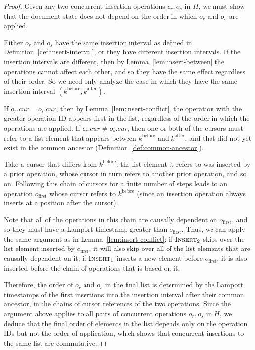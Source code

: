 \documentclass[10pt,journal,compsoc]{IEEEtran}
\begin{document}
\begin{proof}
Given any two concurrent insertion operations $o_r, o_s$ in $H$, we must show that the document state does not depend on the order in which $o_r$ and $o_s$ are applied.

Either $o_r$ and $o_s$ have the same insertion interval as defined in Definition~\ref{def:insert-interval}, or they have different insertion intervals. If the insertion intervals are different, then by Lemma~\ref{lem:insert-between} the operations cannot affect each other, and so they have the same effect regardless of their order. So we need only analyze the case in which they have the same insertion interval $(k^\mathrm{before}, k^\mathrm{after})$.

If $o_r.\mathit{cur} = o_s.\mathit{cur}$, then by Lemma~\ref{lem:insert-conflict}, the operation with the greater operation ID appears first in the list, regardless of the order in which the operations are applied. If $o_r.\mathit{cur} \not= o_s.\mathit{cur}$, then one or both of the cursors must refer to a list element that appears between $k^\mathrm{before}$ and $k^\mathrm{after}$, and that did not yet exist in the common ancestor (Definition~\ref{def:common-ancestor}).

Take a cursor that differs from $k^\mathrm{before}$: the list element it refers to was inserted by a prior operation, whose cursor in turn refers to another prior operation, and so on. Following this chain of cursors for a finite number of steps leads to an operation $o_\mathrm{first}$ whose cursor refers to $k^\mathrm{before}$ (since an insertion operation always inserts at a position after the cursor).

Note that all of the operations in this chain are causally dependent on $o_\mathrm{first}$, and so they must have a Lamport timestamp greater than $o_\mathrm{first}$. Thus, we can apply the same argument as in Lemma~\ref{lem:insert-conflict}: if $\textsc{Insert}_2$ skips over the list element inserted by $o_\mathrm{first}$, it will also skip over all of the list elements that are causally dependent on it; if $\textsc{Insert}_1$ inserts a new element before $o_\mathrm{first}$, it is also inserted before the chain of operations that is based on it.

Therefore, the order of $o_r$ and $o_s$ in the final list is determined by the Lamport timestamps of the first insertions into the insertion interval after their common ancestor, in the chains of cursor references of the two operations. Since the argument above applies to all pairs of concurrent operations $o_r, o_s$ in $H$, we deduce that the final order of elements in the list depends only on the operation IDs but not the order of application, which shows that concurrent insertions to the same list are commutative.
\end{proof}
\end{document}
